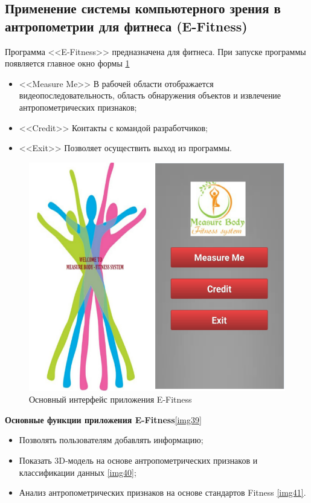 \subsection{Применение системы компьютерного зрения в антропометрии для фитнеса (E-Fitness)}
Программа <<E-Fitness>> предназначена для фитнеса.
При запуске программы появляется главное окно формы \ref{img38}

\begin{itemize}
\item <<Measure Me>> В рабочей области отображается видеопоследовательность, область обнаружения объектов и извлечение антропометрических признаков;
\item <<Credit>> Контакты с командой разработчиков;
\item <<Exit>> Позволяет осуществить выход из программы.
\end{itemize}

\begin{figure}[ht!]
\centering
\includegraphics [scale=0.5] {images/h38.png}
\begin{center}
\caption{Основный интерфейс приложения E-Fitness} \label{img38}
\end{center}
\end{figure}

\textbf{Основные функции приложения E-Fitness}\ref{img39}

\begin{itemize}
	\item Позволять пользователям добавлять информацию;
	\item Показать 3D-модель на основе антропометрических признаков и классификации данных \ref{img40};
	\item Анализ антропометрических признаков на основе стандартов Fitness \ref{img41}.
\end{itemize}

